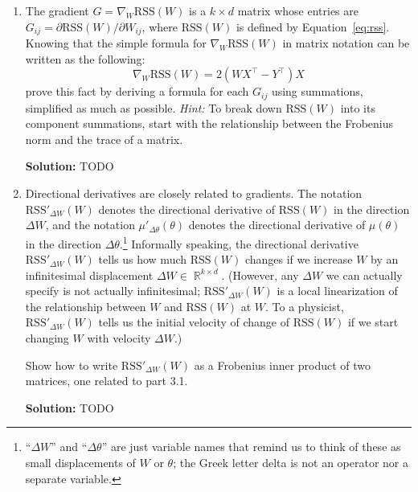 \documentclass{article}
\DeclareMathOperator{\R}{\mathbb{R}}
\newenvironment{solution}{\color{blue} \smallskip \textbf{Solution:}}{}
\begin{document}
\begin{enumerate}

    \item
    The gradient $G = \nabla_W \mathrm{RSS}(W)$ is a $k \times d$ matrix whose entries are $G_{ij} = \partial \mathrm{RSS}(W) / \partial W_{ij}$, where $\mathrm{RSS}(W)$ is defined by Equation~\eqref{eq:rss}.
    Knowing that the simple formula for $\nabla_W \mathrm{RSS}(W)$ in matrix notation can be written as the following:
    \[
        \nabla_W \mathrm{RSS}(W) = 2 (WX^\top - Y^\top) X
    \]
    prove this fact by deriving a formula for each $G_{ij}$ using summations, simplified as much as possible.
    \emph{Hint:} To break down $\mathrm{RSS}(W)$ into its component summations, start with the relationship between the Frobenius norm and the trace of a matrix.

    \begin{solution}
        TODO
    \end{solution}

    \item
    Directional derivatives are closely related to gradients.
    The notation $\mathrm{RSS}'_{\Delta W}(W)$ denotes the directional derivative of $\mathrm{RSS}(W)$ in the direction $\Delta W$, and the notation $\mu'_{\Delta \theta}(\theta)$ denotes the directional derivative of $\mu(\theta)$ in the direction $\Delta \theta$.\footnote{``$\Delta W$'' and ``$\Delta \theta$'' are just variable names that remind us to think of these as small displacements of $W$ or $\theta$; the Greek letter delta is not an operator nor a separate variable.}
    Informally speaking, the directional derivative $\mathrm{RSS}'_{\Delta W}(W)$ tells us how much $\mathrm{RSS}(W)$ changes if we increase $W$ by an infinitesimal displacement $\Delta W \in \R^{k \times d}$.
    (However, any $\Delta W$ we can actually specify is not actually infinitesimal; $\mathrm{RSS}'_{\Delta W}(W)$ is a local linearization of the relationship between $W$ and $\mathrm{RSS}(W)$ at $W$.
    To a physicist, $\mathrm{RSS}'_{\Delta W}(W)$ tells us the initial velocity of change of $\mathrm{RSS}(W)$ if we start changing $W$ with velocity $\Delta W$.)

    Show how to write $\mathrm{RSS}'_{\Delta W}(W)$ as a Frobenius inner product of two matrices, one related to part 3.1.

    \begin{solution}
        TODO
    \end{solution}


\end{enumerate}
\end{document}
